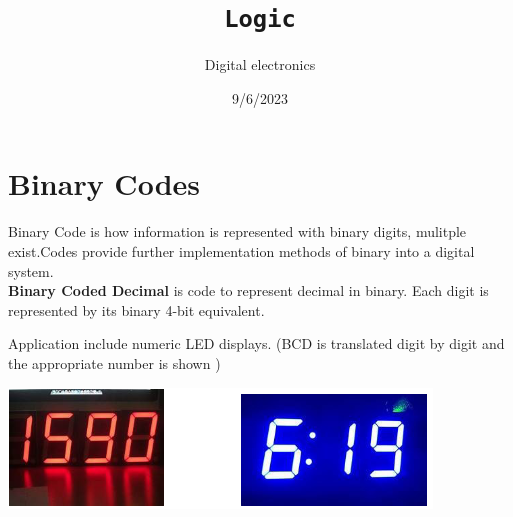\documentclass[a4paper,12pt]{article}
\title{\texttt{Logic}\\\hrulefill}
\author{Digital electronics}
\date{\small{9/6/2023}}
\newenvironment{6mini}{
  \begin{minipage}{6cm}
}{
  \end{minipage}
}
\begin{document}
    \maketitle

    \section{Binary Codes}
        Binary Code is how information is represented with binary digits, mulitple exist.Codes provide further implementation methods of binary into a digital system.\vspace{5pt}\\
        \textbf{Binary Coded Decimal} is code to represent decimal in binary. Each digit is represented by its binary 4-bit equivalent.\\
        \begin{6mini}
            Application include numeric LED displays. (BCD is translated digit by digit and the appropriate number is shown
            )
        \end{6mini}
        \begin{6mini}
            \includegraphics{LED displays.png}
        \end{6mini}
\end{document}
